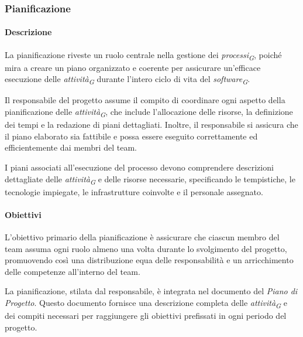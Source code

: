 \subsubsection{Pianificazione}

\paragraph{Descrizione}
La pianificazione riveste un ruolo centrale nella gestione dei \textit{processi}\textsubscript{\textit{G}}, poiché mira a creare un piano organizzato e coerente per assicurare un'efficace esecuzione delle \textit{attività}\textsubscript{\textit{G}} durante l'intero ciclo di vita del \textit{software}\textsubscript{\textit{G}}.

\vspace{0.2cm}

Il responsabile del progetto assume il compito di coordinare ogni aspetto della pianificazione delle \textit{attività}\textsubscript{\textit{G}}, che include l'allocazione delle risorse, la definizione dei tempi e la redazione di piani dettagliati. Inoltre, il responsabile si assicura che il piano elaborato sia fattibile e possa essere eseguito correttamente ed efficientemente dai membri del team.

\vspace{0.2cm}

I piani associati all'esecuzione del processo devono comprendere descrizioni dettagliate delle \textit{attività}\textsubscript{\textit{G}} e delle risorse necessarie, specificando le tempistiche, le tecnologie impiegate, le infrastrutture coinvolte e il personale assegnato.

\paragraph{Obiettivi}

L'obiettivo primario della pianificazione è assicurare che ciascun membro del team assuma ogni ruolo almeno una volta durante lo svolgimento del progetto, promuovendo così una distribuzione equa delle responsabilità e un arricchimento delle competenze all'interno del team.

\vspace{0.2cm}

La pianificazione, stilata dal responsabile, è integrata nel documento del \textit{Piano di Progetto}. Questo documento fornisce una descrizione completa delle \textit{attività}\textsubscript{\textit{G}} e dei compiti necessari per raggiungere gli obiettivi prefissati in ogni periodo del progetto.
